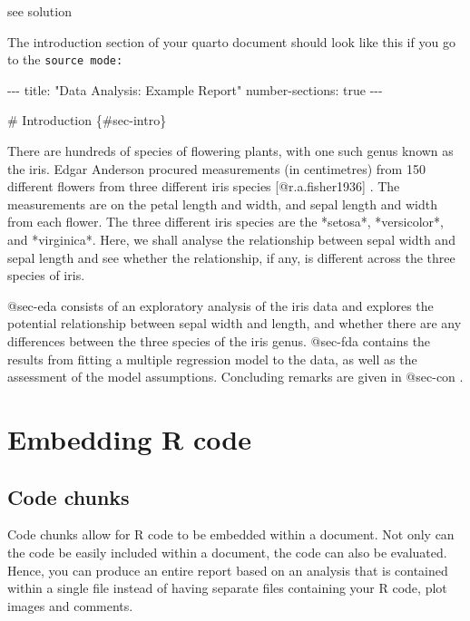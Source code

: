 \documentclass[
  letterpaper,
  DIV=11,
  numbers=noendperiod]{scrartcl}
\newenvironment{Shaded}{\begin{snugshade}}{\end{snugshade}}
\newcommand{\NormalTok}[1]{\textcolor[rgb]{0.00,0.23,0.31}{#1}}
\begin{document}
\begin{tcolorbox}
see solution

The introduction section of your quarto document should look like this
if you go to the \texttt{source\ mode:}

\begin{Shaded}
\begin{Highlighting}[]
\NormalTok{{-}{-}{-}}
\NormalTok{title: "Data Analysis: Example Report"}
\NormalTok{number{-}sections: true}
\NormalTok{{-}{-}{-}}

\NormalTok{\# Introduction \{\#sec{-}intro\}}

\NormalTok{There are hundreds of species of flowering plants, with one such genus known as the iris. Edgar Anderson procured measurements (in centimetres) from 150 different flowers from three different iris species [@r.a.fisher1936] . The measurements are on the petal length and width, and sepal length and width from each flower. The three different iris species are the *setosa*, *versicolor*, and *virginica*. Here, we shall analyse the relationship between sepal width and sepal length and see whether the relationship, if any, is different across the three species of iris.}

\NormalTok{@sec{-}eda consists of an exploratory analysis of the iris data and explores the potential relationship between sepal width and length, and whether there are any differences between the three species of the iris genus. @sec{-}fda contains the results from fitting a multiple regression model to the data, as well as the assessment of the model assumptions. Concluding remarks are given in @sec{-}con .}
\end{Highlighting}
\end{Shaded}

\end{tcolorbox}

\section{Embedding R code}\label{embedding-r-code}

\subsection{Code chunks}\label{code-chunks}

Code chunks allow for R code to be embedded within a document. Not only
can the code be easily included within a document, the code can also be
evaluated. Hence, you can produce an entire report based on an analysis
that is contained within a single file instead of having separate files
containing your R code, plot images and comments.
\end{document}
